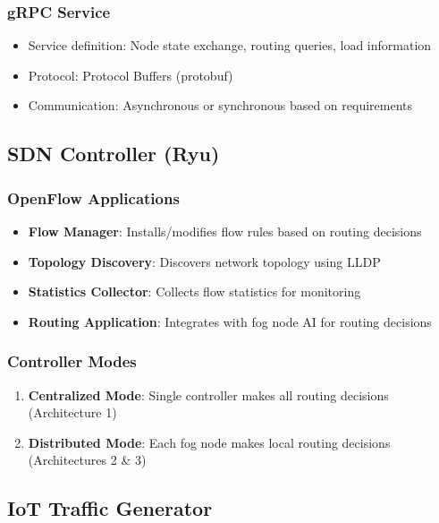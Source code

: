 \documentclass[11pt,a4paper]{article}
\begin{document}
\subsubsection{gRPC Service}
\begin{itemize}
    \item Service definition: Node state exchange, routing queries, load information
    \item Protocol: Protocol Buffers (protobuf)
    \item Communication: Asynchronous or synchronous based on requirements
\end{itemize}

\subsection{SDN Controller (Ryu)}

\subsubsection{OpenFlow Applications}
\begin{itemize}
    \item \textbf{Flow Manager}: Installs/modifies flow rules based on routing decisions
    \item \textbf{Topology Discovery}: Discovers network topology using LLDP
    \item \textbf{Statistics Collector}: Collects flow statistics for monitoring
    \item \textbf{Routing Application}: Integrates with fog node AI for routing decisions
\end{itemize}

\subsubsection{Controller Modes}
\begin{enumerate}
    \item \textbf{Centralized Mode}: Single controller makes all routing decisions (Architecture 1)
    \item \textbf{Distributed Mode}: Each fog node makes local routing decisions (Architectures 2 \& 3)
\end{enumerate}

\subsection{IoT Traffic Generator}
\end{document}
